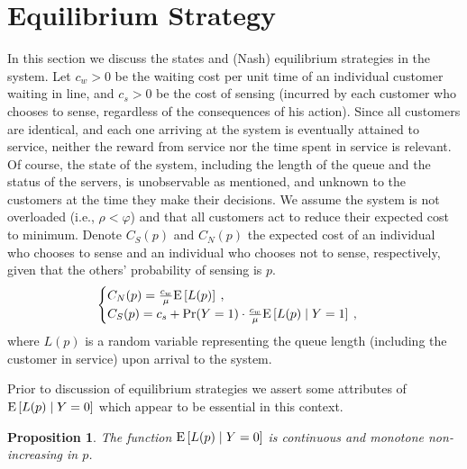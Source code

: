\documentclass[11pt]{article}
\numberwithin{equation}{section}
\newtheorem{proposition}{Proposition}[section]
\newcommand{\pr}{{\rm Pr}}
\newcommand{\e}{{\rm E}}
\begin{document}
\section{Equilibrium Strategy}
In this section we discuss the states and (Nash) equilibrium strategies in the system. Let $c_{w}>0$ be the waiting cost per unit time of an individual customer waiting in line, and $c_{s}>0$ be the cost of sensing (incurred by each customer who chooses to sense, regardless of the consequences of his action). Since all customers are identical, and each one arriving at the system is eventually attained to service, neither the reward from service nor the time spent in service is relevant. Of course, the state of the system, including the length of the queue and the status of the servers, is unobservable as mentioned, and unknown to the customers at the time they make their decisions. We assume the system is not overloaded (i.e., $\rho<\varphi$) and that all customers act to reduce their expected cost to minimum. Denote $C_{S}(p)$ and $C_{N}(p)$ the expected cost of an individual who chooses to sense and an individual who chooses not to sense, respectively, given that the others' probability of sensing is $p$.
\begin{equation}\begin{cases}
 	C_{N}(p) = \frac{c_{w}}{\mu}\e\left[L(p)\right] \:, \\
	C_{S}(p) = c_{s} + \pr(Y=1) \cdot \frac{c_{w}}{\mu} \e\left[L(p)\mid Y=1\right] \:,
\end{cases}
\label{CostFunc}
\end{equation}
where $L(p)$ is a random variable representing the queue length (including the customer in service) upon arrival to the system. 

Prior to discussion of equilibrium strategies we assert some attributes of $\e\left[L(p)\mid Y=0\right]$ which appear to be essential in this context. 

\begin{proposition}
The function $\e\left[L(p)\mid Y=0\right]$ is continuous and monotone non-increasing in $p$. \label{MonotonicityProp}
\end{proposition}
\end{document}
